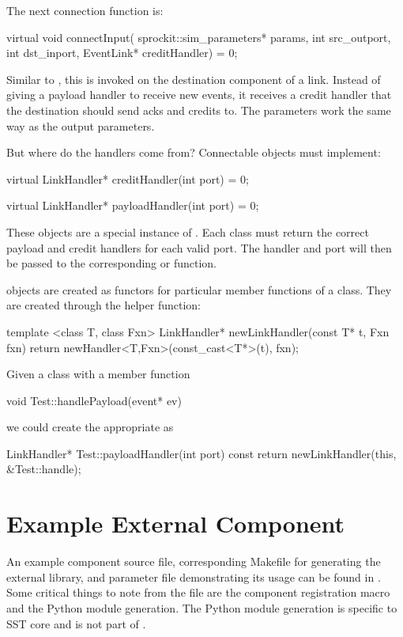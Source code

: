 The next connection function is:
\begin{CppCode}
  virtual void connectInput(
    sprockit::sim_parameters* params,
    int src_outport,
    int dst_inport,
    EventLink* creditHandler) = 0;
\end{CppCode}
Similar to , this is invoked on the destination component of a link.
Instead of giving a payload handler to receive new events,
it receives a credit handler that the destination should send acks and credits to.
The parameters work the same way as the output parameters.

But where do the handlers come from? Connectable objects must implement:

\begin{CppCode}
virtual LinkHandler* creditHandler(int port) = 0;

virtual LinkHandler* payloadHandler(int port) = 0;
\end{CppCode}

These  objects are a special instance of .
Each class must return the correct payload and credit handlers for each valid port.
The handler and port will then be passed to the corresponding  or  function.

 objects are created as functors for particular member functions of a class.
They are created through the helper function:

\begin{CppCode}
template <class T, class Fxn>
LinkHandler* newLinkHandler(const T* t, Fxn fxn){
  return newHandler<T,Fxn>(const_cast<T*>(t), fxn);
}
\end{CppCode}
Given a class  with a member function

\begin{CppCode}
void Test::handlePayload(event* ev)
\end{CppCode}
we could create the appropriate  as

\begin{CppCode}
LinkHandler* Test::payloadHandler(int port) const {
  return newLinkHandler(this, &Test::handle);
}
\end{CppCode}

\section{Example External Component}
An example component source file, corresponding Makefile for generating the external library, and parameter file demonstrating its usage can be found in .
Some critical things to note from the file  are the component registration macro and the Python module generation.
The Python module generation is specific to SST core and is not part of \sstmacro.


